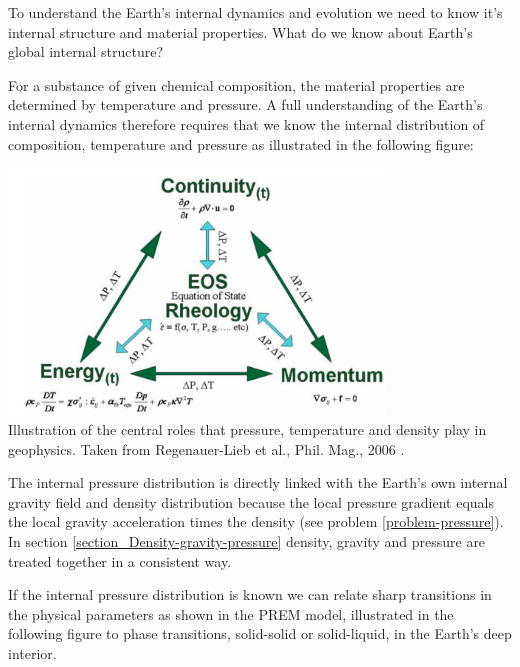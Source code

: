 To understand the Earth's internal dynamics and evolution we need
to know it's internal structure and material properties.
What do we know about Earth's global internal structure?

For a substance of given chemical composition, the material properties
are determined by temperature and pressure.
A full understanding of the Earth's internal dynamics therefore
requires that we know the internal distribution of composition, 
temperature and pressure as illustrated in the following figure:

\begin{center}
\includegraphics[width=10cm]{images/gravity/reg}\\
{\captionfont
Illustration of the central roles that pressure, temperature and density play in geophysics. 
Taken from Regenauer-Lieb et al., Phil. Mag., 2006 \cite{rehy06}.
}
\end{center}
 
The internal pressure distribution is directly linked with the Earth's 
own internal gravity field and density distribution because
the local pressure gradient equals the local gravity acceleration
times the density (see problem \ref{problem-pressure}).
In section \ref{section_Density-gravity-pressure} density, gravity
and pressure are treated together in a consistent way. 

If the internal pressure distribution is known we can relate sharp
transitions in the physical parameters as shown in the PREM model,
illustrated in the following figure 
to phase transitions, solid-solid or solid-liquid, 
in the Earth's deep interior.

